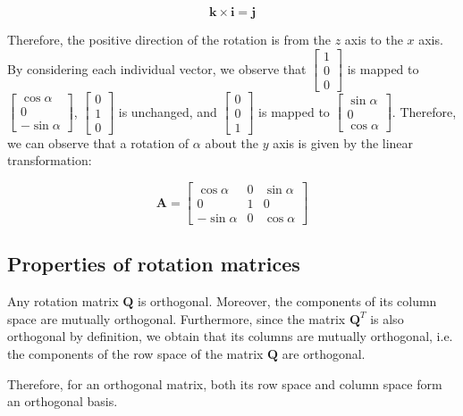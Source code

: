\documentclass[12pt]{article}
\begin{document}
\[ \mathbf{k \times i = j} \]

Therefore, the positive direction of the rotation is from the $z$ axis to the $x$ axis. By considering each individual vector, we observe that $\begin{bmatrix}
    1 \\ 0 \\ 0
\end{bmatrix}$ is mapped to $\begin{bmatrix}
    \cos{\alpha} \\ 0 \\ -\sin{\alpha}
\end{bmatrix}$, $\begin{bmatrix}
    0 \\ 1 \\ 0
\end{bmatrix}$ is unchanged, and $\begin{bmatrix}
    0 \\ 0 \\ 1
\end{bmatrix}$ is mapped to $\begin{bmatrix}
    \sin{\alpha} \\ 0 \\ \cos{\alpha}
\end{bmatrix}$. Therefore, we can observe that a rotation of $\alpha$ about the $y$ axis is given by the linear transformation:

\[ \mathbf{A} = \begin{bmatrix}
    \cos{\alpha} & 0 & \sin{\alpha} \\
    0 & 1 & 0 \\
    -\sin{\alpha} & 0 & \cos{\alpha}
\end{bmatrix} \]

\newpage

\subsection{Properties of rotation matrices}

\begin{proposition}[Orthogonality]
    Any rotation matrix $\mathbf{Q}$ is orthogonal. Moreover, the components of its column space are mutually orthogonal. Furthermore, since the matrix $\mathbf{Q}^T$ is also orthogonal by definition, we obtain that its columns are mutually orthogonal, i.e. the components of the row space of the matrix $\mathbf{Q}$ are orthogonal.

    Therefore, for an orthogonal matrix, both its row space and column space form an orthogonal basis.
\end{proposition}
\end{document}
